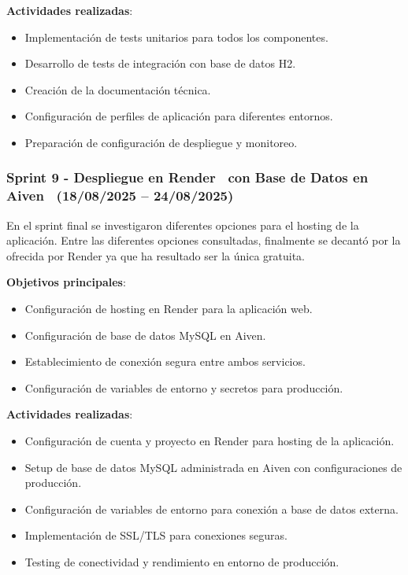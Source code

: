\textbf{Actividades realizadas}:
\begin{itemize}
\tightlist
\item
Implementación de tests unitarios para todos los componentes.
\item
Desarrollo de tests de integración con base de datos H2.
\item
Creación de la documentación técnica.
\item
Configuración de perfiles de aplicación para diferentes entornos.
\item
Preparación de configuración de despliegue y monitoreo.
\end{itemize}

\subsubsection{Sprint 9 - Despliegue en Render~\cite{render} con Base de Datos en Aiven~\cite{aiven} (18/08/2025 – 24/08/2025)} 
En el sprint final se investigaron diferentes opciones para el hosting de la aplicación. Entre las diferentes opciones consultadas, finalmente se decantó por la ofrecida por Render ya que ha resultado ser la única gratuita.

\textbf{Objetivos principales}:
\begin{itemize}
\tightlist
\item
Configuración de hosting en Render para la aplicación web.
\item
Configuración de base de datos MySQL en Aiven.
\item
Establecimiento de conexión segura entre ambos servicios.
\item
Configuración de variables de entorno y secretos para producción.
\end{itemize}

\textbf{Actividades realizadas}:
\begin{itemize}
\tightlist
\item
Configuración de cuenta y proyecto en Render para hosting de la aplicación.
\item
Setup de base de datos MySQL administrada en Aiven con configuraciones de producción.
\item
Configuración de variables de entorno para conexión a base de datos externa.
\item
Implementación de SSL/TLS para conexiones seguras.
\item
Testing de conectividad y rendimiento en entorno de producción.
\end{itemize}

